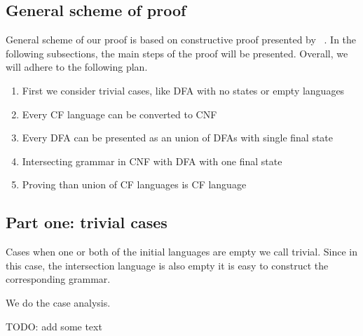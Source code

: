 \subsection{General scheme of proof}

General scheme of our proof is based on constructive proof presented by ~\cite{!!!}. In the following subsections, the main steps of the proof will be presented. Overall, we will adhere to the following plan. 

\begin{enumerate}
	\item First we consider trivial cases, like DFA with no states or empty languages
	\item Every CF language can be converted to CNF
	\item Every DFA can be presented as an union of DFAs with single final state
	\item Intersecting grammar in CNF with DFA with one final state
	\item Proving than union of CF languages is CF language
\end{enumerate}

\subsection{Part one: trivial cases}

Cases when one or both of the initial languages are empty we call trivial. Since in this case, the intersection language is also empty it is easy to construct the corresponding grammar.

We do the case analysis. 


TODO: add some text


% 


